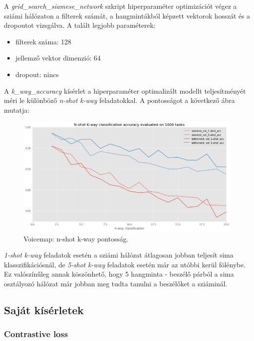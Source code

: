 A \emph{grid\_search\_siamese\_network} szkript hiperparaméter optimizációt végez a sziámi hálózaton a filterek számát, a hangmintákból képzett vektorok hosszát és a dropoutot vizsgálva. A talált legjobb paraméterek:

\begin{itemize}
	\item filterek száma: 128
	\item jellemző vektor dimenzió: 64
	\item dropout: nincs
\end{itemize}

A \emph{k\_way\_accuracy} kísérlet a hiperparaméter optimalizált modellt teljesítményét méri le különböző \emph{n-shot k-way} feladatokkal. A pontosságot a következő ábra mutatja:

\begin{figure}[!ht]
	\centering
	\includegraphics[width=150mm, keepaspectratio]{figures/voicemap-n-shot-k-way.png}
	\caption{Voicemap: n-shot k-way pontosság.}
	\label{fig:voicemap-n-shot-k-way}
\end{figure}

\emph{1-shot k-way} feladatok esetén a sziámi hálózat átlagosan jobban teljesít sima klasszifikációsnál, de \emph{5-shot k-way} feladatok esetén már az utóbbi kerül fölénybe. Ez valószínűleg annak köszönhető, hogy 5 hangminta - beszélő párból a sima osztályozó hálózat már jobban meg tudta tanulni a beszélőket a sziáminál.

\newpage

\subsection{Saját kísérletek}

\subsubsection{Contrastive loss}


